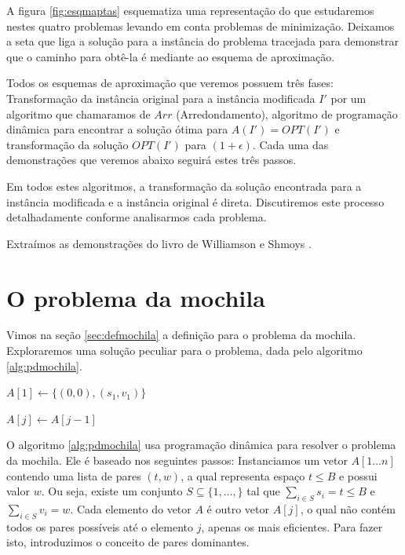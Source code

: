 A figura \ref{fig:esqmaptas} esquematiza uma representação do que estudaremos nestes quatro problemas levando em conta problemas de minimização. Deixamos a seta que liga a solução para a instância do problema tracejada para demonstrar que o caminho para obtê-la é mediante ao esquema de aproximação.

Todos os esquemas de aproximação que veremos possuem três fases: Transformação da instância original para a instância modificada $I'$ por um algoritmo que chamaramos de $Arr$ (Arredondamento), algoritmo de programação dinâmica para encontrar a solução ótima para $A(I') = OPT(I')$ e transformação da solução $OPT(I')$ para $(1+\epsilon)$. Cada uma das demonstrações que veremos abaixo seguirá estes três passos.

Em todos estes algoritmos, a transformação da solução encontrada para a instância modificada e a instância original é direta. Discutiremos este processo detalhadamente conforme analisarmos cada problema.

Extraímos as demonstrações do livro de Williamson e Shmoys \cite{Williamson}.

\section{O problema da mochila}

\label{ref:ptasMochila}

Vimos na seção \ref{sec:defmochila} a definição para o problema da mochila. Exploraremos uma solução peculiar para o problema, dada pelo algoritmo \ref{alg:pdmochila}.

\begin{algorithm}[H]
\SetAlgoLined
{}
$A[1] \leftarrow \{(0,0),(s_1,v_1)\}$ 

{
    $A[j] \leftarrow A[j-1] $
    
}


\caption{$Mochila$}
\label{alg:pdmochila}
\end{algorithm}

O algoritmo \ref{alg:pdmochila} usa programação dinâmica para resolver o problema da mochila. Ele é baseado nos seguintes passos: Instanciamos um vetor $A[1 \ldots n]$ contendo uma lista de pares $(t,w)$, a qual representa espaço $t \leq B$ e possui valor $w$. Ou seja, existe um conjunto $ S \subseteq \{ 1, \ldots, \}$ tal que $\sum_{i \in S} s_i = t \leq B$ e $\sum_{i \in S} v_i = w$. Cada elemento do vetor $A$ é outro vetor $A[j]$, o qual não contém todos os pares possíveis até o elemento $j$, apenas os mais eficientes. Para fazer isto, introduzimos o conceito de pares dominantes.

